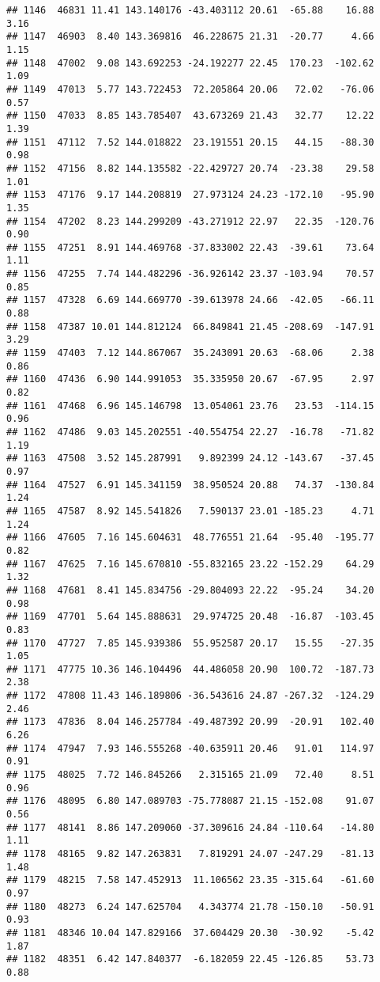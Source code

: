 \documentclass[]{article}
\begin{document}
\begin{verbatim}
## 1146  46831 11.41 143.140176 -43.403112 20.61  -65.88    16.88  3.16
## 1147  46903  8.40 143.369816  46.228675 21.31  -20.77     4.66  1.15
## 1148  47002  9.08 143.692253 -24.192277 22.45  170.23  -102.62  1.09
## 1149  47013  5.77 143.722453  72.205864 20.06   72.02   -76.06  0.57
## 1150  47033  8.85 143.785407  43.673269 21.43   32.77    12.22  1.39
## 1151  47112  7.52 144.018822  23.191551 20.15   44.15   -88.30  0.98
## 1152  47156  8.82 144.135582 -22.429727 20.74  -23.38    29.58  1.01
## 1153  47176  9.17 144.208819  27.973124 24.23 -172.10   -95.90  1.35
## 1154  47202  8.23 144.299209 -43.271912 22.97   22.35  -120.76  0.90
## 1155  47251  8.91 144.469768 -37.833002 22.43  -39.61    73.64  1.11
## 1156  47255  7.74 144.482296 -36.926142 23.37 -103.94    70.57  0.85
## 1157  47328  6.69 144.669770 -39.613978 24.66  -42.05   -66.11  0.88
## 1158  47387 10.01 144.812124  66.849841 21.45 -208.69  -147.91  3.29
## 1159  47403  7.12 144.867067  35.243091 20.63  -68.06     2.38  0.86
## 1160  47436  6.90 144.991053  35.335950 20.67  -67.95     2.97  0.82
## 1161  47468  6.96 145.146798  13.054061 23.76   23.53  -114.15  0.96
## 1162  47486  9.03 145.202551 -40.554754 22.27  -16.78   -71.82  1.19
## 1163  47508  3.52 145.287991   9.892399 24.12 -143.67   -37.45  0.97
## 1164  47527  6.91 145.341159  38.950524 20.88   74.37  -130.84  1.24
## 1165  47587  8.92 145.541826   7.590137 23.01 -185.23     4.71  1.24
## 1166  47605  7.16 145.604631  48.776551 21.64  -95.40  -195.77  0.82
## 1167  47625  7.16 145.670810 -55.832165 23.22 -152.29    64.29  1.32
## 1168  47681  8.41 145.834756 -29.804093 22.22  -95.24    34.20  0.98
## 1169  47701  5.64 145.888631  29.974725 20.48  -16.87  -103.45  0.83
## 1170  47727  7.85 145.939386  55.952587 20.17   15.55   -27.35  1.05
## 1171  47775 10.36 146.104496  44.486058 20.90  100.72  -187.73  2.38
## 1172  47808 11.43 146.189806 -36.543616 24.87 -267.32  -124.29  2.46
## 1173  47836  8.04 146.257784 -49.487392 20.99  -20.91   102.40  6.26
## 1174  47947  7.93 146.555268 -40.635911 20.46   91.01   114.97  0.91
## 1175  48025  7.72 146.845266   2.315165 21.09   72.40     8.51  0.96
## 1176  48095  6.80 147.089703 -75.778087 21.15 -152.08    91.07  0.56
## 1177  48141  8.86 147.209060 -37.309616 24.84 -110.64   -14.80  1.11
## 1178  48165  9.82 147.263831   7.819291 24.07 -247.29   -81.13  1.48
## 1179  48215  7.58 147.452913  11.106562 23.35 -315.64   -61.60  0.97
## 1180  48273  6.24 147.625704   4.343774 21.78 -150.10   -50.91  0.93
## 1181  48346 10.04 147.829166  37.604429 20.30  -30.92    -5.42  1.87
## 1182  48351  6.42 147.840377  -6.182059 22.45 -126.85    53.73  0.88

\end{verbatim}
\end{document}
